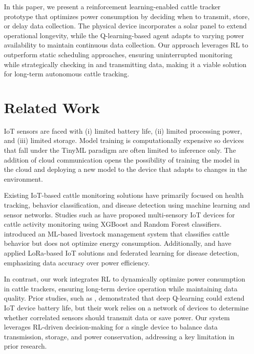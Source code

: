 \documentclass[10pt]{cai}
\begin{document}
In this paper, we present a reinforcement learning-enabled cattle tracker prototype that optimizes power consumption by deciding when to transmit, store, or delay data collection.
The physical device incorporates a solar panel to extend operational longevity, while the Q-learning-based agent adapts to varying power availability to maintain continuous data collection. 
Our approach leverages RL to outperform static scheduling approaches, ensuring uninterrupted monitoring while strategically checking in and transmitting data, making it a viable solution for long-term autonomous cattle tracking.

\section{Related Work}
IoT sensors are faced with (i) limited battery life, (ii) limited processing power, and (iii) limited storage\cite{chenDeepReinforcementLearning2021}.
Model training is computationally expensive so devices that fall under the TinyML paradigm are often limited to inference only\cite{rayReviewTinyMLStateoftheart2022}.
The addition of cloud communication opens the possibility of training the model in the cloud and deploying a new model to the device that adapts to changes in the environment.

Existing IoT-based cattle monitoring solutions have primarily focused on health tracking, behavior classification, and disease detection using machine learning and sensor networks. 
Studies such as \cite{duttaMOOnitorIoTBased2022} have proposed multi-sensory IoT devices for cattle activity monitoring using XGBoost and Random Forest classifiers. 
\cite{yamsaniIoTBasedLivestockMonitoring2024} introduced an ML-based livestock management system that classifies cattle behavior but does not optimize energy consumption. 
Additionally, \cite{arshadFederatedLearningModel2024} and \cite{iRealTimeCattle2024} have applied LoRa-based IoT solutions and federated learning for disease detection, emphasizing data accuracy over power efficiency.

In contrast, our work integrates RL to dynamically optimize power consumption in cattle trackers, ensuring long-term device operation while maintaining data quality. 
Prior studies, such as \cite{hribarUsingDeepQLearning2019}, demonstrated that deep Q-learning could extend IoT device battery life, but their work relies on a network of devices to determine whether correlated sensors should transmit data or save power.
Our system leverages RL-driven decision-making for a single device to balance data transmission, storage, and power conservation, addressing a key limitation in prior research.
\end{document}
